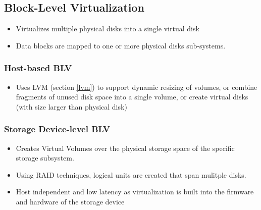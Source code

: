 \documentclass{article}
\begin{document}
\subsection{Block-Level Virtualization}
\begin{itemize}
    \item Virtualizes multiple physical disks into a single virtual disk
    
    \item Data blocks are mapped to one or more physical disks sub-systems. 
\end{itemize}

\subsubsection{Host-based BLV}
\begin{itemize}
    \item Uses LVM (section \ref{lvm}) to support dynamic resizing of volumes, or combine fragments of unused disk space into a single volume, or create virtual disks (with size larger than physical disk)
\end{itemize}

\subsubsection{Storage Device-level BLV}
\begin{itemize}
    \item Creates Virtual Volumes over the physical storage space of the specific storage subsystem.
    
    \item Using RAID techniques, logical units are created that span mulitple disks. 
    
    \item Host independent and low latency as virtualization is built into the firmware and hardware of the storage device
\end{itemize}
\end{document}
